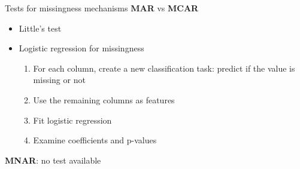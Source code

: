 \documentclass[11pt,compress,t,notes=noshow, xcolor=table]{beamer}
\begin{document}



\begin{frame}{Tests for missingness mechanisms}
\vfill
\textbf{MAR} vs \textbf{MCAR}
\begin{itemize}
    \vfill
    \item Little's test
    \item Logistic regression for missingness
    \begin{enumerate}
        \item For each column, create a new classification task: predict if the value is missing or not
        \item Use the remaining columns as features
        \item Fit logistic regression
        \item Examine coefficients and p-values
    \end{enumerate}
    \vfill
\end{itemize}
\textbf{MNAR}: no test available
\vfill
\end{frame}
\end{document}

